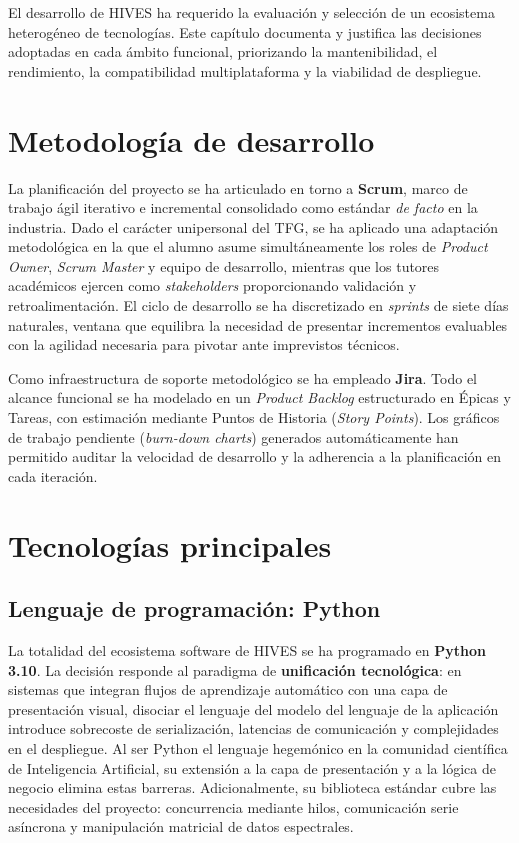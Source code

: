 
El desarrollo de HIVES ha requerido la evaluación y selección de un ecosistema heterogéneo de tecnologías. Este capítulo documenta y justifica las decisiones adoptadas en cada ámbito funcional, priorizando la mantenibilidad, el rendimiento, la compatibilidad multiplataforma y la viabilidad de despliegue.

\section{Metodología de desarrollo}

La planificación del proyecto se ha articulado en torno a \textbf{Scrum}, marco de trabajo ágil iterativo e incremental consolidado como estándar \textit{de facto} en la industria. Dado el carácter unipersonal del TFG, se ha aplicado una adaptación metodológica en la que el alumno asume simultáneamente los roles de \textit{Product Owner}, \textit{Scrum Master} y equipo de desarrollo, mientras que los tutores académicos ejercen como \textit{stakeholders} proporcionando validación y retroalimentación. El ciclo de desarrollo se ha discretizado en \textit{sprints} de siete días naturales, ventana que equilibra la necesidad de presentar incrementos evaluables con la agilidad necesaria para pivotar ante imprevistos técnicos.

Como infraestructura de soporte metodológico se ha empleado \textbf{Jira}. Todo el alcance funcional se ha modelado en un \textit{Product Backlog} estructurado en Épicas y Tareas, con estimación mediante Puntos de Historia (\textit{Story Points}). Los gráficos de trabajo pendiente (\textit{burn-down charts}) generados automáticamente han permitido auditar la velocidad de desarrollo y la adherencia a la planificación en cada iteración.

\section{Tecnologías principales}

\subsection{Lenguaje de programación: Python}

La totalidad del ecosistema software de HIVES se ha programado en \textbf{Python 3.10}. La decisión responde al paradigma de \textbf{unificación tecnológica}: en sistemas que integran flujos de aprendizaje automático con una capa de presentación visual, disociar el lenguaje del modelo del lenguaje de la aplicación introduce sobrecoste de serialización, latencias de comunicación y complejidades en el despliegue. Al ser Python el lenguaje hegemónico en la comunidad científica de Inteligencia Artificial, su extensión a la capa de presentación y a la lógica de negocio elimina estas barreras. Adicionalmente, su biblioteca estándar cubre las necesidades del proyecto: concurrencia mediante hilos, comunicación serie asíncrona y manipulación matricial de datos espectrales.

